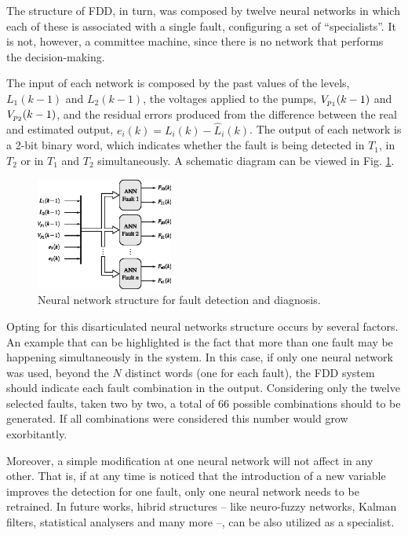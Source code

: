 \documentclass[10pt,fleqn,a4paper]{article}
\begin{document}
The structure of FDD, in turn, was composed by twelve neural networks in which
each of these is associated with a single fault, configuring a set of
``specialists''. It is not, however, a committee machine, since there is no
network that performs the decision-making.

The input of each network is composed by the past values of the levels,
$L_1(k-1)$ and $L_2(k-1)$, the voltages applied to the pumps, $V_{p_{\tiny 1}}
(k-1)$ and $V_{p_{\tiny 2}} (k-1)$, and the residual errors produced from the
difference between the real and estimated output, $e_i (k) = L_i (k) -
\widehat{L}_i (k)$. The output of each network is a 2-bit binary word, which
indicates whether the fault is being detected in $T_1$, in $T_2$ or in $T_1$ and
$T_2$ simultaneously. A schematic diagram can be viewed in Fig.
\ref{fig:ann_fdd}.

\begin{figure}[htb]
\centering
    \includegraphics[width=0.4\textwidth]{imgs/ann_fdd}
    \caption{Neural network structure for fault detection and diagnosis.}
    \label{fig:ann_fdd}
\end{figure}

Opting for this disarticulated neural networks structure occurs by several
factors. An example that can be highlighted is the fact that more than one fault
may be happening simultaneously in the system. In this case, if only one neural
network was used, beyond the $N$ distinct words (one for each fault), the FDD
system should indicate each fault combination in the output. Considering only
the twelve selected faults, taken two by two, a total of 66 possible
combinations should to be generated. If all combinations were considered this
number would grow exorbitantly.

Moreover, a simple modification at one neural network will not affect in any
other. That is, if at any time is noticed that the introduction of a new
variable improves the detection for one fault, only one neural network needs to
be retrained. In future works, hibrid structures -- like neuro-fuzzy networks,
Kalman filters, statistical analysers and many more --, can be also utilized as
a specialist.
\end{document}
